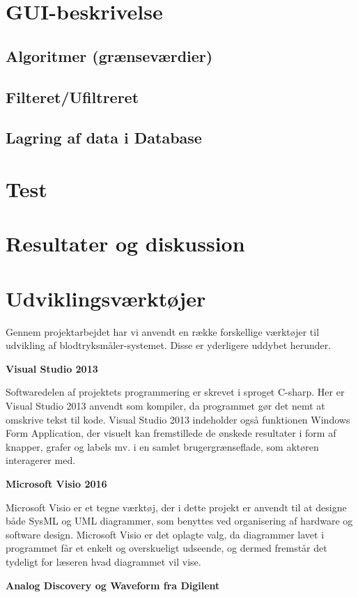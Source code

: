 \section{GUI-beskrivelse}
\subsection{Algoritmer (grænseværdier)}
\subsection{Filteret/Ufiltreret}
\subsection{Lagring af data i Database}

\section{Test}
\section{Resultater og diskussion}
\section{Udviklingsværktøjer}
Gennem projektarbejdet har vi anvendt en række forskellige værktøjer til udvikling af blodtryksmåler-systemet. Disse er yderligere uddybet herunder.

\textbf{Visual Studio 2013}

Softwaredelen af projektets programmering er skrevet i sproget C-sharp. Her er Visual Studio 2013 anvendt som kompiler, da programmet gør det nemt at omskrive tekst til kode. Visual Studio 2013 indeholder også funktionen Windows Form Application, der visuelt kan fremstillede de ønskede resultater i form af knapper, grafer og labels mv. i en samlet brugergrænseflade, som aktøren interagerer med. 

\textbf{Microsoft Visio 2016}

Microsoft Visio er et tegne værktøj, der i dette projekt er anvendt til at designe både SysML og UML diagrammer, som benyttes ved organisering af hardware og software design. Microsoft Visio er det oplagte valg, da diagrammer lavet i programmet får et enkelt og overskueligt udseende, og dermed fremstår det tydeligt for læseren hvad diagrammet vil vise.

\textbf{Analog Discovery og Waveform fra Digilent}


